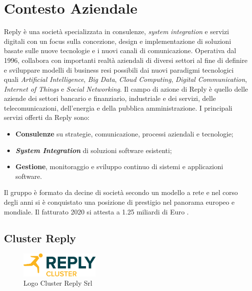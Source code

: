 \graphicspath{{./chapters/01/assets/}}
\chapter{Contesto Aziendale}
\label{cha:intro}

Reply è una società specializzata in consulenze, \textit{system integration} e servizi digitali con un focus sulla concezione, design e implementazione di soluzioni basate sulle nuove tecnologie e i nuovi canali di comunicazione. Operativa dal 1996, collabora con importanti realtà aziendali di diversi settori al fine di definire e sviluppare modelli di business resi possibili dai nuovi paradigmi tecnologici quali \textit{Artificial Intelligence}, \textit{Big Data}, \textit{Cloud Computing}, \textit{Digital Communication}, \textit{Internet of Things} e \textit{Social Networking}.
Il campo di azione di Reply è quello delle aziende dei settori bancario e finanziario, industriale e dei servizi, delle telecomunicazioni, dell'energia e della pubblica amministrazione.
I principali servizi offerti da Reply sono:
\begin{itemize}
  \item \textbf{Consulenze} su strategie, comunicazione, processi aziendali e tecnologie;
  \item \textbf{\textit{System Integration}} di soluzioni software esistenti;
  \item \textbf{Gestione}, monitoraggio e sviluppo continuo di sistemi e applicazioni software.
\end{itemize}

Il gruppo è formato da decine di società secondo un modello a rete e nel corso degli anni si è conquistato una posizione di prestigio nel panorama europeo e mondiale. Il fatturato 2020 si attesta a \num{1,25} miliardi di Euro \cite{fatturato}.

\section{Cluster Reply}

\begin{figure}[ht]
  \centering
  \includegraphics[width=0.35\textwidth]{logo-cluster-reply.png}
  \caption{Logo Cluster Reply Srl}
  \label{fig:replyClusterLogo}
\end{figure}


